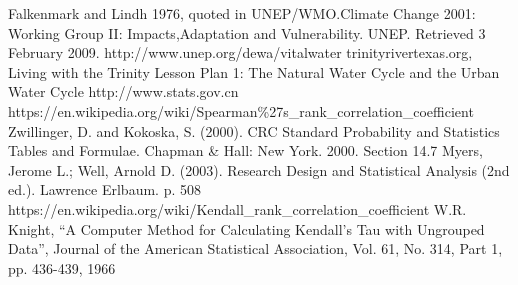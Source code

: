 \begin{thebibliography}{99}
   {Falkenmark and Lindh 1976, quoted in UNEP/WMO.Climate Change 2001: Working Group II: Impacts,Adaptation and Vulnerability. UNEP. Retrieved 3 February 2009.}
   http://www.unep.org/dewa/vitalwater
   trinityrivertexas.org, Living with the Trinity Lesson Plan 1: The Natural Water Cycle and the Urban Water Cycle
   http://www.stats.gov.cn
   https://en.wikipedia.org/wiki/Spearman\%27s\_rank\_correlation\_coefficient
   Zwillinger, D. and Kokoska, S. (2000). CRC Standard Probability and Statistics Tables and Formulae. Chapman \& Hall: New York. 2000. Section 14.7
   Myers, Jerome L.; Well, Arnold D. (2003). Research Design and Statistical Analysis (2nd ed.). Lawrence Erlbaum. p. 508
   https://en.wikipedia.org/wiki/Kendall\_rank\_correlation\_coefficient
   W.R. Knight, “A Computer Method for Calculating Kendall’s Tau with Ungrouped Data”, Journal of the American Statistical Association, Vol. 61, No. 314, Part 1, pp. 436-439, 1966

\end{thebibliography}

